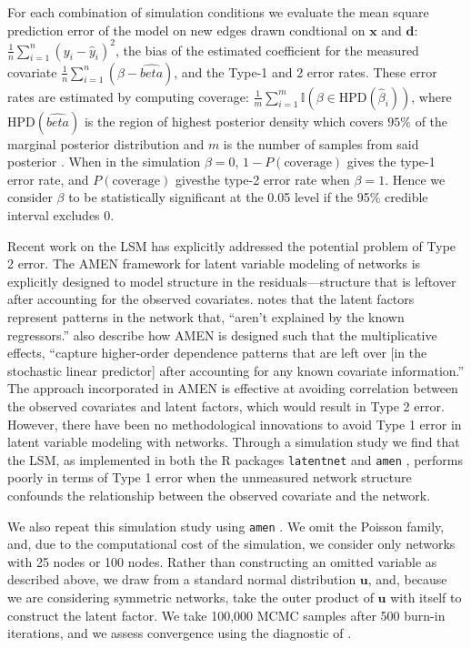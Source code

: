 \documentclass[11pt]{article}
\begin{document}
For each combination of simulation conditions we evaluate the mean
square prediction error of the model on new edges drawn condtional on
$\mathbf{x}$ and $\mathbf{d}$: $\frac{1}{n}\sum_{i=1}^{n}(y_{i} - \hat{y}_i)^2$, the bias of the estimated coefficient
for the measured covariate $\frac{1}{n} \sum_{i=1}^n (\beta - \hat{beta})$, and the Type-1 and 2 error
rates. These error rates are estimated by computing coverage: $\frac{1}{m} \sum_{i=1}^m\mathbb{I}(\beta \in \text{HPD}(\hat{\beta}_i))$, where $\text{HPD}(\hat{beta})$ is the region of highest posterior density which covers $95\%$ of the marginal posterior distribution and $m$ is the number of samples from said posterior \cite{turkkan1993computation}. When in the simulation $\beta = 0$, $1 - P(\text{coverage})$ gives the type-1 error rate, and $P(\text{coverage})$ givesthe type-2 error rate when $\beta = 1$. Hence we consider $\beta$ to be statistically
significant at the 0.05 level if the 95\% credible interval excludes 0.




Recent work on the LSM has explicitly addressed the potential problem
of Type 2 error. The AMEN framework for latent variable modeling of
networks is explicitly designed to model structure in the
residuals---structure that is leftover after accounting for the
observed covariates. \citet[p. 43]{hoff2015dyadic} notes that the
latent factors represent patterns in the network that, ``aren't
explained by the known regressors.''
\citet[pp. 12--13]{minhas2016inferential} also describe how AMEN is
designed such that the multiplicative effects, ``capture higher-order
dependence patterns that are left over [in the stochastic linear
  predictor] after accounting for any known covariate information.''
The approach incorporated in AMEN is effective at avoiding correlation
between the observed covariates and latent factors, which would result
in Type 2 error. However, there have been no methodological
innovations to avoid Type 1 error in latent variable modeling with
networks. Through a simulation study we find that the LSM, as
implemented in both the R \citep{R} packages \texttt{latentnet}
\citep{latentnet} and \texttt{amen} \citep{amen}, performs poorly in
terms of Type 1 error when the unmeasured network structure confounds
the relationship between the observed covariate and the network.

We also repeat this simulation study using \texttt{amen}
\citep{hoff2015dyadic, minhas2016inferential}. We omit the Poisson
family, and, due to the computational cost of the simulation, we
consider only networks with 25 nodes or 100 nodes. Rather than
constructing an omitted variable as described above, we draw from a
standard normal distribution $\mathbf{u}$, and, because we are
considering symmetric networks, take the outer product of $\mathbf{u}$
with itself to construct the latent factor. We take 100,000 MCMC
samples after 500 burn-in iterations, and we assess convergence using
the diagnostic of \cite{raftery1992practical}.
\end{document}
